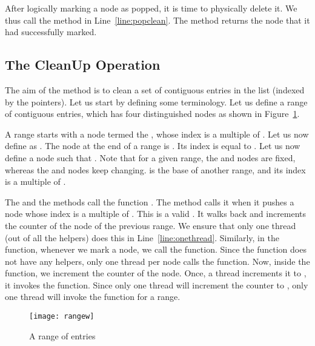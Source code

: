 \documentclass{llncs}
\begin{document}
After logically marking a node as popped, it is time to physically delete it. We thus
call the  method in Line~\ref{line:popclean}. The  method returns the
node that it had successfully marked.
\vspace{-3mm}
\subsection{The CleanUp Operation}

The aim of the  method is to clean a set of  contiguous entries in the list (indexed by 
the  pointers). Let us start by defining some terminology. Let us define a range of  
contiguous entries, which has four distinguished nodes as shown in Figure~\ref{fig:rangew}.

A range starts with a node termed the , whose index is a multiple of . Let us now define
 as . The node at the end of a range is . Its index is equal to 
. Let us now define a node  such that . 
Note that for a given range, the  and  nodes are fixed, whereas the  and
 nodes keep changing.  is the base of another range, and its index is
a multiple of . 

The  and the  methods call the function . The  method calls it when
it pushes a node whose index is a multiple of . This is a valid . It walks back 
and increments the counter of the  node of the previous range. We ensure that only one thread
(out of all the helpers) does this in Line~\ref{line:onethread}. Similarly, in the  function,
whenever we mark a node, we call the  function. Since the  function does not
have any helpers, only one thread per node calls the  function. Now, inside
the  function, we increment the counter of the  node. Once, a thread increments it to 
, it invokes the  function. Since only one thread will increment the counter to , 
only one thread will invoke the  function for a range. 
\vspace{-4mm}
\begin{figure}[!htb]
\begin{center}
\texttt{[image: rangew]}
\caption{A range of  entries \label{fig:rangew} }
\end{center}
\end{figure}
\vspace{-8mm}
\end{document}
